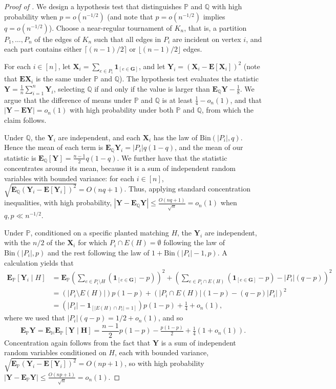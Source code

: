 \documentclass[11pt]{article}
\newcommand{\e}{{\mathbf E}}
\newcommand{\Ind}[1]{{\mathbf 1}_{[#1]}}
\newcommand{\bG}{\mathbf{G}}
\newcommand{\bH}{\mathbf{H}}
\newcommand{\bX}{\mathbf{X}}
\newcommand{\bY}{\mathbf{Y}}
\newcommand{\bbH}{\mathbb{H}}
\newcommand{\bbP}{\mathbb{P}}
\newcommand{\bbQ}{\mathbb{Q}}
\numberwithin{equation}{section}
\numberwithin{thm}{section}
\newcommand{\Bin}{\mathrm{Bin}}
\begin{document}
\begin{proof}[Proof of ]
We design a hypothesis test that distinguishes $\bbP$ and $\bbQ$ with high probability when $p = o(n^{-1/2})$ (and note that $p = o(n^{-1/2})$ implies $q = o(n^{-1/2})$).
Choose a near-regular tournament of $K_n$, that is, a partition $P_1,\ldots,P_n$ of the edges of $K_n$ such that all edges in $P_i$ are incident on vertex $i$, and each part contains either $\lceil (n-1)/2 \rceil$ or $\lfloor (n-1)/2 \rfloor$ edges.

For each $i \in [n]$, let $\bX_i = \sum_{e \in P_i} \Ind{e \in \bG}$, and let $\bY_i = (\bX_i - \e[\bX_i])^2$ (note that $\e\bX_i$ is the same under $\bbP$ and $\bbQ$).
The hypothesis test evaluates the statistic $\bY = \frac{1}{n}\sum_{i=1}^n \bY_i$, selecting $\bbQ$ if and only if the value is larger than $\e_\bbQ\bY - \frac{1}{8}$.
We  argue that the difference of means under $\bbP$ and $\bbQ$ is at least $\frac{1}{4}-o_n(1)$, and that $|\bY-\e\bY| = o_n(1)$ with high probability under both $\bbP$ and $\bbQ$, from which the claim follows.

Under $\bbQ$, the $\bY_i$ are independent, and each $\bX_i$ has the law of $\Bin(|P_i|,q)$.
Hence the mean of each term is $\e_{\bbQ} \bY_i = |P_i|q(1-q)$, and the mean of our statistic is $\e_{\bbQ}[\bY] = \frac{n-1}{2}q(1-q)$.
We further have that the statistic concentrates around its mean, because it is a sum of independent random variables with bounded variance: for each $i \in [n]$, $\sqrt{\e_{\bbQ} (\bY_i - \e[\bY_i])^2} = O(nq + 1)$.
Thus, applying standard concentration inequalities, with high probability, $|\bY - \e_\bbQ \bY| \le \frac{O(nq+1)}{\sqrt{n}} =o_n(1)$ when $q,p \ll n^{-1/2}$.

Under $\bbP$, conditioned on a specific planted matching $H$, the $\bY_i$ are independent, with the $n/2$ of the $\bX_i$ for which $P_i \cap E(H) = \emptyset$ following the law of $\Bin(|P_i|,p)$ and the rest following the law of $1+\Bin(|P_i|-1,p)$. 
A calculation yields that
\begin{align*}
\e_{\bbP} \left[ \bY_i \mid H\right] 
&= \e_{\bbP} \left(\sum_{e \in P_i \setminus H} (\Ind{e\in \bG} - p)\right)^2 + \left( \sum_{e \in P_i \cap E(H)} (\Ind{e\in \bG}-p) - |P_i|(q-p)\right)^2\\
&= (|P_i\setminus E(H)|)p(1-p) + (|P_i \cap E(H)|(1-p) -(q-p)|P_i|)^2 \\
&= (|P_i| - \Ind{|E(H)\cap P_i| = 1})p(1-p) + \tfrac{1}{4}+o_n(1),
\end{align*}
where we used that $|P_{i}|(q-p) = 1/2 + o_{n}(1)$, 
and so 
\[
\e_{\bbP}\bY = \e_{\bbH}\e_{\bbP}[\bY \mid \bH] = \frac{n-1}{2}p(1-p) - \tfrac{p(1-p)}{2} + \tfrac{1}{4}(1+o_n(1)).
\]
Concentration again follows from the fact that $\bY$ is a sum of independent random variables conditioned on $H$, each with bounded variance, $\sqrt{\e_{\bbP} (\bY_i - \e[\bY_i])^2} = O(np + 1)$, so with high probability $|\bY - \e_{\bbP}\bY| \le \frac{O(np + 1)}{\sqrt{n}} = o_n(1)$.


\end{proof}
\end{document}
